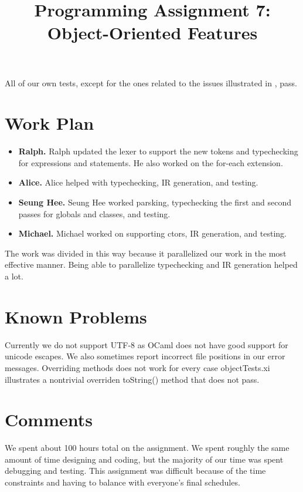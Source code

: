 \documentclass{hw} \title{Programming Assignment 7:\\ Object-Oriented Features}
\begin{document}
All of our own tests, except for the ones related to the issues illustrated in , pass.

\section{Work Plan}\label{sec:workplan}
\begin{itemize} \item \textbf{Ralph.} Ralph updated the lexer to support the new tokens and typechecking for expressions and statements. He also worked on the for-each extension.

  \item \textbf{Alice.} Alice helped with typechecking, IR generation, and testing.

  \item \textbf{Seung Hee.} Seung Hee worked parsking, typechecking the first and second passes for globals and classes, and testing.

  \item \textbf{Michael.} Michael worked on supporting ctors, IR generation, and testing.
\end{itemize}

The work was divided in this way because it parallelized our work in the most effective manner. Being able to parallelize typechecking and IR generation helped a lot.

\section{Known Problems}\label{sec:problems} Currently we do not support UTF-8
as OCaml does not have good support for unicode escapes. We also sometimes
report incorrect file positions in our error messages. Overriding methods does not work for every case objectTests.xi illustrates a nontrivial overriden toString() method that does not pass.

\section{Comments}\label{sec:comments} We spent about 100 hours total on the
assignment. We spent roughly the same amount of time designing and coding, but the majority of our time was spent debugging and testing. This assignment was difficult because of the time constraints and having to balance with everyone's final schedules.
\end{document}
